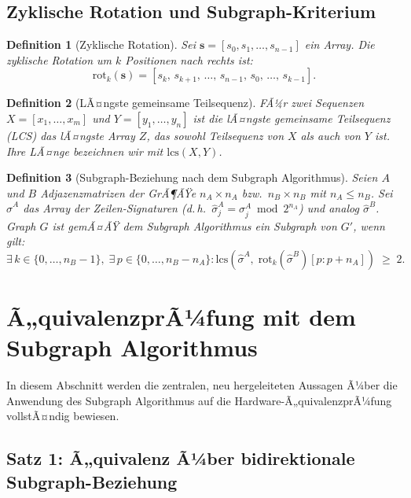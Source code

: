 ﻿\documentclass[12pt,a4paper]{report}
\newtheorem{definition}{Definition}[section]
\begin{document}
\subsection{Zyklische Rotation und Subgraph-Kriterium}

\begin{definition}[Zyklische Rotation]
\label{def:rotation}
Sei $\boldsymbol{s} = [s_0, s_1, \ldots, s_{n-1}]$ ein Array. Die \emph{zyklische Rotation um $k$ Positionen nach rechts} ist:
\[
\mathrm{rot}_k(\boldsymbol{s}) = [s_k,\, s_{k+1},\, \ldots,\, s_{n-1},\, s_0,\, \ldots,\, s_{k-1}].
\]
\end{definition}

\begin{definition}[LÃ¤ngste gemeinsame Teilsequenz]
FÃ¼r zwei Sequenzen $X = [x_1, \ldots, x_m]$ und $Y = [y_1, \ldots, y_n]$ ist die \emph{lÃ¤ngste gemeinsame Teilsequenz} (LCS) das lÃ¤ngste Array $Z$, das sowohl Teilsequenz von $X$ als auch von $Y$ ist. Ihre LÃ¤nge bezeichnen wir mit $\mathrm{lcs}(X, Y)$.
\end{definition}

\begin{definition}[Subgraph-Beziehung nach dem Subgraph Algorithmus]
\label{def:subgraph_beziehung}
Seien $A$ und $B$ Adjazenzmatrizen der GrÃ¶ÃŸe $n_A \times n_A$ bzw.\ $n_B \times n_B$ mit $n_A \leq n_B$. Sei $\hat{\sigma}^A$ das Array der Zeilen-Signaturen (d.\,h.\ $\hat{\sigma}^A_j = \sigma_j^A \bmod 2^{n_A}$) und analog $\hat{\sigma}^B$. Graph $G$ ist gemÃ¤ÃŸ dem Subgraph Algorithmus ein Subgraph von $G'$, wenn gilt:
\[
\exists\, k \in \{0,\ldots,n_B-1\},\; \exists\, p \in \{0,\ldots,n_B - n_A\} : \mathrm{lcs}\!\left(\hat{\sigma}^A,\; \mathrm{rot}_k(\hat{\sigma}^B)[p:p+n_A]\right) \;\geq\; 2.
\]
\end{definition}

\section{Ã„quivalenzprÃ¼fung mit dem Subgraph Algorithmus}
\label{subsec:neue_saetze}

In diesem Abschnitt werden die zentralen, neu hergeleiteten Aussagen Ã¼ber die Anwendung des Subgraph Algorithmus auf die Hardware-Ã„quivalenzprÃ¼fung vollstÃ¤ndig bewiesen.

\subsection{Satz 1: Ã„quivalenz Ã¼ber bidirektionale Subgraph-Beziehung}
\end{document}
